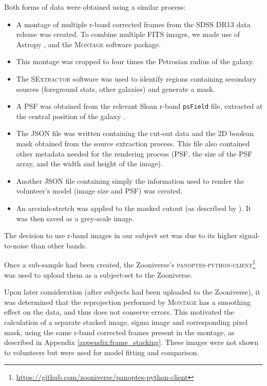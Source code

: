 \documentclass[../main.tex]{subfiles}
\begin{document}
Both forms of data were obtained using a similar process:

\begin{itemize}
\item A montage of multiple r-band corrected frames from the SDSS DR13 \citep{2017ApJS..233...25A} data release was created. To combine multiple FITS images, we made use of Astropy \citep{2018AJ....156..123A}, and the \textsc{Montage} \citep{2010arXiv1005.4454J} software package.
\item This montage was cropped to four times the Petrosian radius of the galaxy.
\item The \textsc{SExtractor} software \citep{source-extractor} was used to identify regions containing secondary sources (foreground stats, other galaxies) and generate a mask.
\item A PSF was obtained from the relevant Sloan r-band \texttt{psField} file, extracted at the central position of the galaxy \citep{2002AJ....123..485S}.
\item The JSON file was written containing the cut-out data and the 2D boolean mask obtained from the source extraction process. This file also contained other metadata needed for the rendering process (PSF, the size of the PSF array, and the width and height of the image).
\item Another JSON file containing simply the information used to render the volunteer's model (image size and PSF) was created.
\item An arcsinh-stretch was applied to the masked cutout (as described by \citealt{Lupton2003:astro-ph/0312483v1}). It was then saved as a grey-scale image.
\end{itemize}

The decision to use r-band images in our subject set was due to its higher signal-to-noise than other bands.

Once a sub-sample had been created, the Zooniverse's \textsc{panoptes-python-client}\footnote{\url{https://github.com/zooniverse/panoptes-python-client}} was used to upload them as a subject-set to the Zooniverse.

Upon later consideration (after subjects had been uploaded to the Zooniverse), it was determined that the reprojection performed by \textsc{Montage} has a smoothing effect on the data, and thus does not conserve errors. This motivated the calculation of a separate stacked image, sigma image and corresponding pixel mask, using the same r-band corrected frames present in the montage, as described in Appendix \ref{appendix:frame_stacking}. These images were not shown to volunteers but were used for model fitting and comparison.
\end{document}
